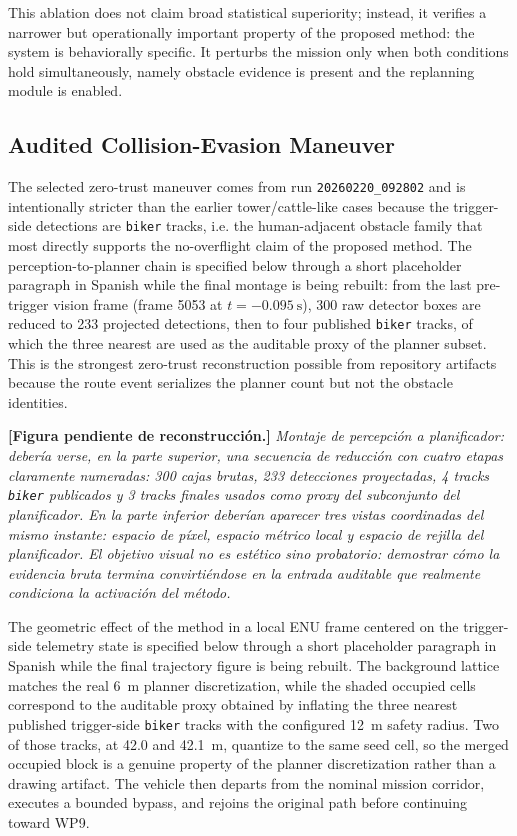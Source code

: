 \documentclass[a4paper,11pt]{article}
\newcommand{\diagramplaceholder}[1]{\par\smallskip\noindent\textbf{[Figura pendiente de reconstrucción.] } \emph{#1}\par\smallskip}
\begin{document}
This ablation does not claim broad statistical superiority; instead, it verifies a narrower but operationally important property of the proposed method: the system is behaviorally specific. It perturbs the mission only when both conditions hold simultaneously, namely obstacle evidence is present and the replanning module is enabled.

\subsection{Audited Collision-Evasion Maneuver}

The selected zero-trust maneuver comes from run \texttt{20260220\_092802} and is intentionally stricter than the earlier tower/cattle-like cases because the trigger-side detections are \texttt{biker} tracks, i.e. the human-adjacent obstacle family that most directly supports the no-overflight claim of the proposed method. The perception-to-planner chain is specified below through a short placeholder paragraph in Spanish while the final montage is being rebuilt: from the last pre-trigger vision frame (frame 5053 at \(t=-\SI{0.095}{\second}\)), 300 raw detector boxes are reduced to 233 projected detections, then to four published \texttt{biker} tracks, of which the three nearest are used as the auditable proxy of the planner subset. This is the strongest zero-trust reconstruction possible from repository artifacts because the route event serializes the planner count but not the obstacle identities.

\diagramplaceholder{Montaje de percepción a planificador: debería verse, en la parte superior, una secuencia de reducción con cuatro etapas claramente numeradas: 300 cajas brutas, 233 detecciones proyectadas, 4 tracks \texttt{biker} publicados y 3 tracks finales usados como proxy del subconjunto del planificador. En la parte inferior deberían aparecer tres vistas coordinadas del mismo instante: espacio de píxel, espacio métrico local y espacio de rejilla del planificador. El objetivo visual no es estético sino probatorio: demostrar cómo la evidencia bruta termina convirtiéndose en la entrada auditable que realmente condiciona la activación del método.}

The geometric effect of the method in a local ENU frame centered on the trigger-side telemetry state is specified below through a short placeholder paragraph in Spanish while the final trajectory figure is being rebuilt. The background lattice matches the real \SI{6}{\meter} planner discretization, while the shaded occupied cells correspond to the auditable proxy obtained by inflating the three nearest published trigger-side \texttt{biker} tracks with the configured \SI{12}{\meter} safety radius. Two of those tracks, at 42.0 and \SI{42.1}{\meter}, quantize to the same seed cell, so the merged occupied block is a genuine property of the planner discretization rather than a drawing artifact. The vehicle then departs from the nominal mission corridor, executes a bounded bypass, and rejoins the original path before continuing toward WP9.
\end{document}
